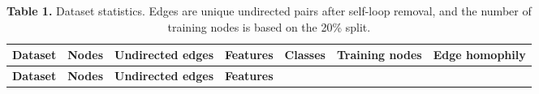 \begin{longtable}[]{@{}
  >{\raggedright\arraybackslash}p{}
  >{\centering\arraybackslash}p{}
  >{\centering\arraybackslash}p{}
  >{\centering\arraybackslash}p{}
  >{\centering\arraybackslash}p{}
  >{\centering\arraybackslash}p{}
  >{\centering\arraybackslash}p{}@{}}
\caption{\textbf{Table 1.} Dataset statistics. Edges are unique undirected pairs after self-loop removal, and the number of training nodes is based on the 20\% split.}\tabularnewline
\toprule\noalign{}
\begin{minipage}[b]{\linewidth}\raggedright
\textbf{Dataset}
\end{minipage} & \begin{minipage}[b]{\linewidth}\centering
\textbf{Nodes}
\end{minipage} & \begin{minipage}[b]{\linewidth}\centering
\textbf{Undirected edges}
\end{minipage} & \begin{minipage}[b]{\linewidth}\centering
\textbf{Features}
\end{minipage} & \begin{minipage}[b]{\linewidth}\centering
\textbf{Classes}
\end{minipage} & \begin{minipage}[b]{\linewidth}\centering
\textbf{Training nodes}
\end{minipage} & \begin{minipage}[b]{\linewidth}\centering
\textbf{Edge homophily}
\end{minipage} \\
\midrule\noalign{}
\endfirsthead
\toprule\noalign{}
\begin{minipage}[b]{\linewidth}\raggedright
\textbf{Dataset}
\end{minipage} & \begin{minipage}[b]{\linewidth}\centering
\textbf{Nodes}
\end{minipage} & \begin{minipage}[b]{\linewidth}\centering
\textbf{Undirected edges}
\end{minipage} & \begin{minipage}[b]{\linewidth}\centering
\textbf{Features}
\end{minipage} & \begin{minipage}[b]{\linewidth}\centering

\end{minipage}
\end{longtable}
